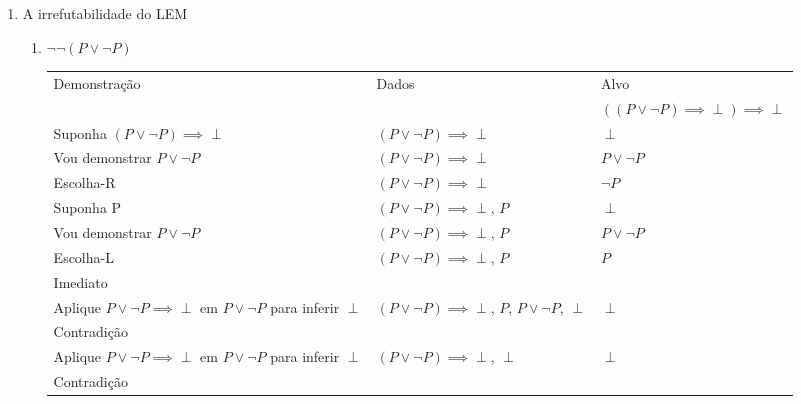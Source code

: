 \documentclass[a4paper, 12pt]{article}
\begin{document}
\begin{enumerate}
    \item A irrefutabilidade do LEM
    \begin{enumerate}[1.]
        \item $\neg \neg (P \lor \neg P)$
        \begin{table}[h!]
            \centering
            \begin{tabular}{|p{4cm} | p{4cm} | p{4cm} |}
            \rowcolor{gray!50}
            Demonstração & Dados & Alvo \\
            & & $((P \lor \neg P) \implies \perp) \implies \perp$\\
            Suponha $(P \lor \neg P) \implies \perp$ & $(P \lor \neg P) \implies \perp$ & $\perp$ \\
            \hline
            \rowcolor{red!25}
            Vou demonstrar $P \lor \neg P$ & $(P \lor \neg P) \implies \perp$ & $P \lor \neg P$ \\
            \rowcolor{red!25}
            Escolha-R & $(P \lor \neg P) \implies \perp$ & $\neg P$\\
            \rowcolor{red!25}
            Suponha P & $(P \lor \neg P) \implies \perp$, $P$ & $\perp$\\
            \hline
            \rowcolor{blue!25}
            Vou demonstrar $P \lor \neg P$ & $(P \lor \neg P) \implies \perp$, $P$ & $P \lor \neg P$ \\
            \rowcolor{blue!25}
            Escolha-L & $(P \lor \neg P) \implies \perp$, $P$ & $P$\\
            \rowcolor{blue!25}
            Imediato & & \\
            \hline
            \rowcolor{red!25}
            Aplique $P \lor \neg P \implies \perp$ em $P \lor \neg P$ para inferir $\perp$ & $(P \lor \neg P) \implies \perp$, $P$, $P \lor \neg P$, $\perp$ & $\perp$ \\
            \rowcolor{red!25}
            Contradição & &\\
            \hline
            Aplique $P \lor \neg P \implies \perp$ em $P \lor \neg P$ para inferir $\perp$ & $(P \lor \neg P) \implies \perp$, $\perp$ & $\perp$\\
            Contradição & & \\
            \hline
            \end{tabular}
        \end{table}
    \end{enumerate}


\end{enumerate}
\end{document}
